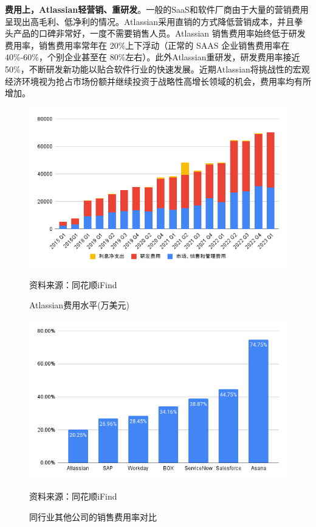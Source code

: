 \textbf{费用上，Atlassian轻营销、重研发}。一般的SaaS和软件厂商由于大量的营销费用呈现出高毛利、低净利的情况。Atlassian采用直销的方式降低营销成本，并且拳头产品的口碑非常好，一度不需要销售人员。Atlassian 销售费用率始终低于研发费用率，销售费用率常年在 20\%上下浮动（正常的 SAAS 企业销售费用率在40\%-60\%，个别企业甚至在 80\%左右）。此外Atlassian重研发，研发费用率接近50\%，不断研发新功能以贴合软件行业的快速发展。近期Atlassian将挑战性的宏观经济环境视为抢占市场份额并继续投资于战略性高增长领域的机会，费用率均有所增加。

\begin{figure}[H]
    \caption{Atlassian费用水平(万美元)}
    \begin{center}
        \includegraphics[width=0.9\linewidth]{img/cost.png}
    \end{center}
    \footnotesize{资料来源：同花顺iFind}
\end{figure}
\begin{figure}[H]
    \caption{同行业其他公司的销售费用率对比}
    \begin{center}
        \includegraphics[width=0.9\linewidth]{img/SM.png}
    \end{center}
    \footnotesize{资料来源：同花顺iFind}
\end{figure}

